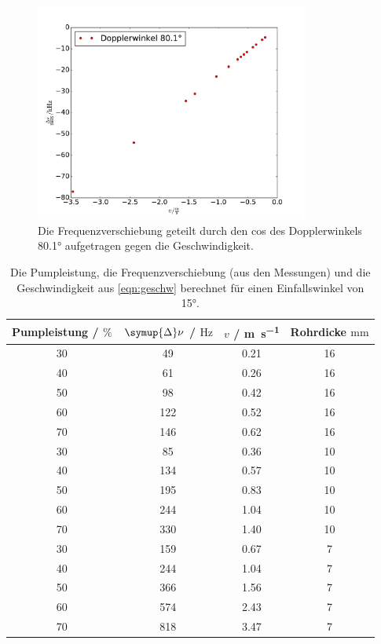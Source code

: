 \documentclass[
  bibliography=totoc,     %
  captions=tableheading,  %
  titlepage=firstiscover, %
]{scrartcl}
\begin{document}
\begin{figure}
    \centering
      \includegraphics[width=0.8\textwidth]{a15.pdf}
      \caption{Die Frequenzverschiebung geteilt durch den cos des
      Dopplerwinkels 80.1° aufgetragen gegen die Geschwindigkeit.}
      \label{fig:1}
  \end{figure}
 \begin{table}
    \centering
    \begin{tabular}{c c c c}
      \toprule
      Pumpleistung / $\%$ & $\symup{\Delta} \nu$ / $\si{\hertz}$ & $v$ /
      \si{\meter\per\second} & Rohrdicke $\si{\milli\meter}$ \\
      \midrule
      30 & 49 & 0.21  & 16\\
      40 & 61 & 0.26  & 16\\
      50 & 98 & 0.42  & 16\\
      60 & 122 & 0.52  & 16\\
      70 & 146 & 0.62  & 16\\
      30 & 85 & 0.36  & 10\\
      40 & 134 & 0.57  & 10\\
      50 & 195 & 0.83  & 10\\
      60 & 244 & 1.04 & 10\\
      70 & 330 & 1.40 & 10\\
      30 & 159 & 0.67  & 7\\
      40 & 244 & 1.04 & 7\\
      50 & 366 & 1.56 & 7\\
      60 & 574 & 2.43 & 7\\
      70 & 818 & 3.47 & 7\\
      \bottomrule
    \end{tabular}
    \caption{Die Pumpleistung, die Frequenzverschiebung (aus den Messungen) und
    die Geschwindigkeit aus \eqref{eqn:geschw} berechnet für einen Einfallswinkel
    von 15°.}
    \label{tab:2}
  \end{table}
\end{document}
